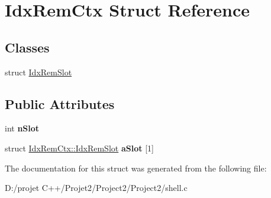 \hypertarget{struct_idx_rem_ctx}{}\section{Idx\+Rem\+Ctx Struct Reference}
\label{struct_idx_rem_ctx}
\subsection*{Classes}
\begin{DoxyCompactItemize}
\item 
struct \mbox{\hyperlink{struct_idx_rem_ctx_1_1_idx_rem_slot}{Idx\+Rem\+Slot}}
\end{DoxyCompactItemize}
\subsection*{Public Attributes}
\begin{DoxyCompactItemize}
\item 
\mbox{\label{struct_idx_rem_ctx_a3b9d1ae4a074643be8644dbfd0d5f43a}} 
int {\bfseries n\+Slot}
\item 
\mbox{\label{struct_idx_rem_ctx_a6c0e21d42b46ce62ae48131cf1138de1}} 
struct \mbox{\hyperlink{struct_idx_rem_ctx_1_1_idx_rem_slot}{Idx\+Rem\+Ctx\+::\+Idx\+Rem\+Slot}} {\bfseries a\+Slot} \mbox{[}1\mbox{]}
\end{DoxyCompactItemize}


The documentation for this struct was generated from the following file\+:\begin{DoxyCompactItemize}
\item 
D\+:/projet C++/\+Projet2/\+Project2/\+Project2/shell.\+c\end{DoxyCompactItemize}
